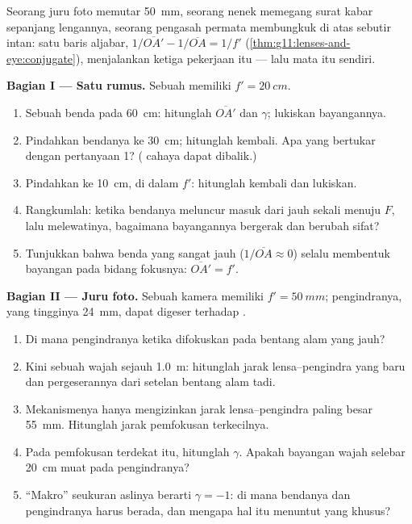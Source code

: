 \begin{problem}
\label{pb:g11:lenses-and-eye:1}
Seorang juru foto memutar  \qty{50}{mm}, seorang nenek memegang
surat kabar sepanjang lengannya, seorang pengasah permata membungkuk di
atas sebutir intan: satu baris aljabar,
$1/\overline{OA'} - 1/\overline{OA} = 1/f'$
(\cref{thm:g11:lenses-and-eye:conjugate}), menjalankan ketiga pekerjaan
itu --- lalu mata itu sendiri.

\medskip
\noindent\textbf{Bagian I --- Satu rumus.} Sebuah 
memiliki $f' = \qty{20}{cm}$.
\begin{enumerate}
  \item Sebuah benda pada \qty{60}{cm}: hitunglah $\overline{OA'}$ dan
        $\gamma$; lukiskan bayangannya.
  \item Pindahkan bendanya ke \qty{30}{cm}; hitunglah kembali. Apa yang
        bertukar dengan pertanyaan 1? ( cahaya dapat dibalik.)
  \item Pindahkan ke \qty{10}{cm}, di dalam $f'$: hitunglah kembali dan
        lukiskan.
  \item Rangkumlah: ketika bendanya meluncur masuk dari jauh sekali
        menuju $F$, lalu melewatinya, bagaimana bayangannya bergerak
        dan berubah sifat?
  \item Tunjukkan bahwa benda yang sangat jauh
        ($1/\overline{OA} \approx 0$) selalu membentuk bayangan pada
        bidang fokusnya: $\overline{OA'} = f'$.
\end{enumerate}

\medskip
\noindent\textbf{Bagian II --- Juru foto.}
Sebuah  kamera memiliki $f' = \qty{50}{mm}$; pengindranya, yang
tingginya \qty{24}{mm}, dapat digeser terhadap .
\begin{enumerate}[resume]
  \item Di mana pengindranya ketika difokuskan pada bentang alam yang
        jauh?
  \item Kini sebuah wajah sejauh \qty{1.0}{m}: hitunglah jarak
        lensa--pengindra yang baru dan pergeserannya dari setelan
        bentang alam tadi.
  \item Mekanismenya hanya mengizinkan jarak lensa--pengindra paling
        besar \qty{55}{mm}. Hitunglah jarak pemfokusan terkecilnya.
  \item Pada pemfokusan terdekat itu, hitunglah $\gamma$. Apakah
        bayangan wajah selebar \qty{20}{cm} muat pada pengindranya?
  \item ``Makro'' seukuran aslinya berarti $\gamma = -1$: di mana
        bendanya dan pengindranya harus berada, dan mengapa hal itu
        menuntut  yang khusus?
\end{enumerate}


\end{problem}
